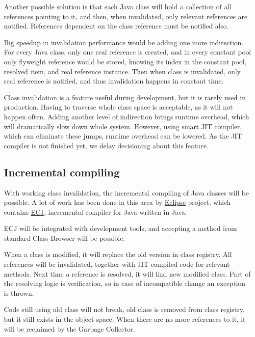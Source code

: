 \documentclass[11pt,twoside,a4paper]{book}
\begin{document}
Another possible solution is that each Java class will hold a collection of all references pointing to it, and then, when invalidated, only relevant references are notified. 
References dependent on the class reference must be notified also.

Big speedup in invalidation performance would be adding one more indirection.
For every Java class, only one real reference is created, and in every constant pool only flyweight reference would be stored, knowing its index in the constant pool, resolved item, and real reference instance. Then when class is invalidated, only real reference is notified, and thus invalidation happens in constant time.

Class invalidation is a feature useful during development, but it is rarely used in production.
Having to traverse whole class space is acceptable, as it will not happen often.
Adding another level of indirection brings runtime overhead, which will dramatically slow down whole system.
However, using smart JIT compiler, which can eliminate these jumps, runtime overhead can be lowered.
As the JIT compiler is not finished yet, we delay decisioning about this feature.

\subsection{Incremental compiling}

With working class invalidation, the incremental compiling of Java classes will be possible.
A lot of work has been done in this area by \href{http://www.eclipse.org}{Eclipse} project, which contains \href{http://eclipse.org/jdt/}{ECJ}, incremental compiler for Java written in Java.

ECJ will be integrated with development tools, and accepting a method from standard Class Browser will be possible.

When a class is modified, it will replace the old version in class registry.
All references will be invalidated, together with JIT compiled code for relevant methods.
Next time a reference is resolved, it will find new modified class.
Part of the resolving logic is verification, so in case of incompatible change an exception is thrown.

Code still using old class will not break, old class is removed from class registry, but it still exists in the object space.
When there are no more references to it, it will be reclaimed by the Garbage Collector.  


\end{document}
